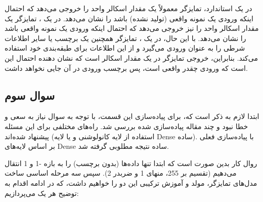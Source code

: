 \documentclass{article}
\begin{document}
در یک  استاندارد، تمایزگر معمولاً یک مقدار اسکالر واحد را خروجی می‌دهد که احتمال اینکه ورودی یک نمونه واقعی (تولید نشده) باشد را نشان می‌دهد. در یک ، تمایزگر یک مقدار اسکالر واحد را نیز خروجی می‌دهد که احتمال اینکه ورودی یک نمونه واقعی باشد را نشان می‌دهد. با این حال، در یک ، تمایزگر همچنین یک برچسب یا سایر اطلاعات شرطی را به عنوان ورودی می‌گیرد و از این اطلاعات برای طبقه‌بندی خود استفاده می‌کند. بنابراین، خروجی تمایزگر در  یک مقدار اسکالر است که نشان دهنده احتمال این است که ورودی چقدر واقعی است، پس برچسب ورودی در آن جایی نخواهد داشت.


\subsection{سوال سوم}

ابتدا لازم به ذکر است که، برای پیاده‌‌سازی این قسمت، با توجه به سوال نیاز به سعی و خطا نبود و چند مقاله پیاده‌سازی شده بررسی شد. راه‌های مختلفی برای این مسئله پیشنهاد شده‌اند (استفاده از لایه کانولوشنی و یا لایه Dense ساده). با پیاده‌سازی فعلی بر اساس لایه‌های Dense ساده نتیجه مطلوبی گرفته شد. 

روال کار بدین صورت است که ابتدا تنها داده‌ها (بدون برچسب) را به بازه -1 و 1 انتقال می‌دهیم (تقسیم بر 255، منهای 1 و ضربدر 2). سپس سه مرحله اساسی ساخت مدل‌های تمایزگر، مولد و آموزش ترکیبی این دو را خواهیم داشت، که در ادامه اقدام به توضیح هر یک می‌پردازیم:
\end{document}
